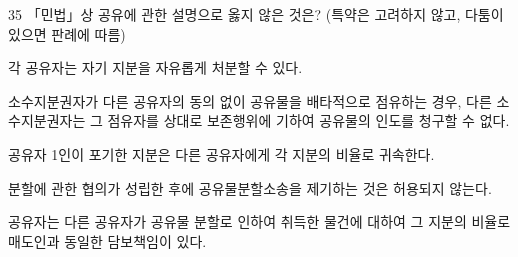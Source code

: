 \begin{question}{35}
「민법」상 공유에 관한 설명으로 옳지 않은 것은? (특약은 고려하지 않고, 다툼이 있으면 판례에 따름)
\begin{choices}
  \item 각 공유자는 자기 지분을 자유롭게 처분할 수 있다.
  \item 소수지분권자가 다른 공유자의 동의 없이 공유물을 배타적으로 점유하는 경우, 다른 소수지분권자는 그 점유자를 상대로 보존행위에 기하여 공유물의 인도를 청구할 수 없다.
  \item 공유자 1인이 포기한 지분은 다른 공유자에게 각 지분의 비율로 귀속한다.
  \item 분할에 관한 협의가 성립한 후에 공유물분할소송을 제기하는 것은 허용되지 않는다.
  \item 공유자는 다른 공유자가 공유물 분할로 인하여 취득한 물건에 대하여 그 지분의 비율로 매도인과 동일한 담보책임이 있다.
\end{choices}
\end{question}
